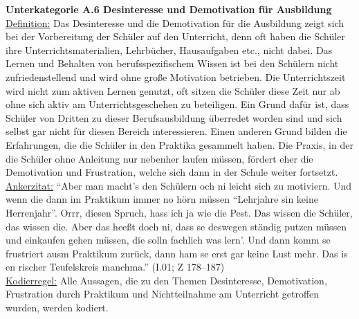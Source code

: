\textbf{Unterkategorie A.6 Desinteresse und Demotivation für Ausbildung}\\
\underline{Definition:} Das Desinteresse und die Demotivation für die Ausbildung zeigt sich bei der Vorbereitung der Schüler auf den Unterricht, denn oft haben die Schüler ihre Unterrichtsmaterialien, Lehrbücher, Hausaufgaben etc., nicht dabei. Das Lernen und Behalten von berufsspezifischem Wissen ist bei den Schülern nicht zufriedenstellend und wird ohne große Motivation betrieben. Die Unterrichtszeit wird nicht zum aktiven Lernen genutzt, oft sitzen die Schüler diese Zeit nur ab ohne sich aktiv am Unterrichtsgeschehen zu beteiligen. Ein Grund dafür ist, dass Schüler von Dritten zu dieser Berufsausbildung überredet worden sind und sich selbst gar nicht für diesen Bereich interessieren. Einen anderen Grund bilden die Erfahrungen, die die Schüler in den Praktika gesammelt haben. Die Praxis, in der die Schüler ohne Anleitung nur nebenher laufen müssen, fördert eher die Demotivation und Frustration, welche sich dann in der Schule weiter fortsetzt.\\
\underline{Ankerzitat:} "`Aber man macht’s den Schülern och ni leicht sich zu motiviern. Und wenn die dann im Praktikum immer no hörn müssen "`Lehrjahre sin keine Herrenjahr"'. Orrr, diesen Spruch, hass ich ja wie die Pest. Das wissen die Schüler, das wissen die. Aber das heeßt doch ni, dass se deswegen ständig putzen müssen und einkaufen gehen müssen, die solln fachlich was lern'. Und dann komm se frustriert ausm Praktikum zurück, dann ham se erst gar keine Lust mehr. Das is en rischer Teufelskreis manchma."' (I.01; Z 178--187)\\
\underline{Kodierregel:} Alle Aussagen, die zu den Themen Desinteresse, Demotivation, Frustration durch Praktikum und Nichtteilnahme am Unterricht getroffen wurden, werden kodiert.\\

